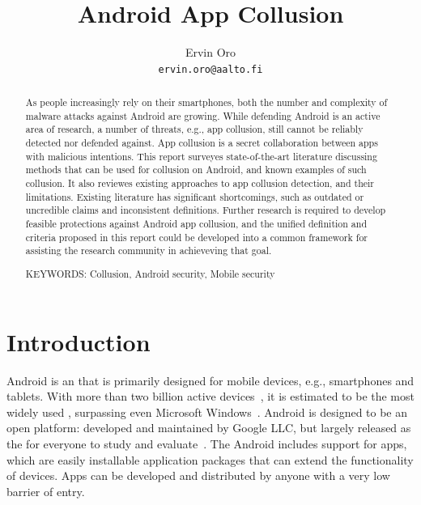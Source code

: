 \documentclass[article]{aaltoseries}
\title{Android App Collusion}
\author{Ervin Oro%
\\\textnormal{\texttt{ervin.oro@aalto.fi}}} %
\affiliation{\textbf{Tutor}: Jorden Whitefield} %
\renewcommand\gls\cgls
\begin{document}

\maketitle

\begin{abstract}

As people increasingly rely on their smartphones, both the number and complexity of malware attacks against Android are growing. While defending Android is an active area of research, a number of threats, e.g., app collusion, still cannot be reliably detected nor defended against. App collusion is a secret collaboration between apps with malicious intentions. This report surveyes state-of-the-art literature discussing methods that can be used for collusion on Android, and known examples of such collusion. It also reviewes existing approaches to app collusion detection, and their limitations. Existing literature has significant shortcomings, such as outdated or uncredible claims and inconsistent definitions. Further research is required to develop feasible protections against Android app collusion, and the unified definition and criteria proposed in this report could be developed into a common framework for assisting the research community in achieveving that goal.

\vspace{3mm}
\noindent KEYWORDS: Collusion, Android security, Mobile security

\end{abstract}


\section{Introduction}
\label{sec:intro}

Android is an \gls{os} that is primarily designed for mobile devices, e.g., smartphones and tablets. With more than two billion active devices~\cite{AOSP2018}, it is estimated to be the most widely used \gls{os}, surpassing even Microsoft Windows~\cite{AWSLLC2018, StatCounter2018}. Android is designed to be an open platform: developed and maintained by Google LLC, but largely released as the \citeauthor{AOSP} for everyone to study and evaluate~\cite{AOSP}. The Android \gls{os} includes support for apps, which are easily installable application packages that can extend the functionality of devices. Apps can be developed and distributed by anyone with a very low barrier of entry.
\end{document}

